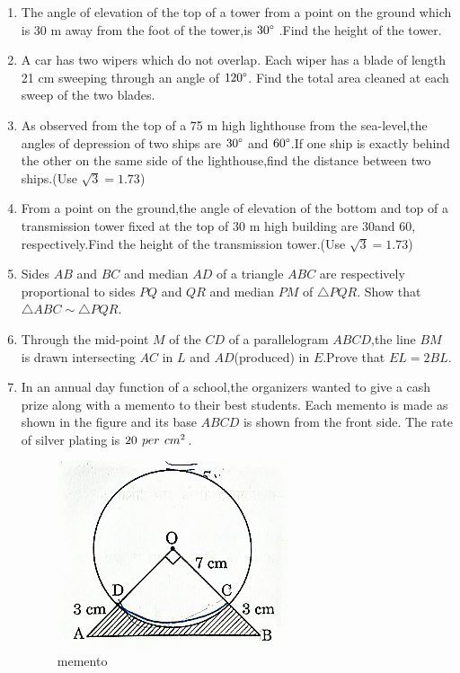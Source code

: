 \documentclass{article}
\begin{document}
\begin{enumerate}
\item  The angle of elevation of the top of a tower from a point on the ground which is 30 m away from the foot of the tower,is $30\degree$ .Find the height of the tower.

\item  A car has two wipers which do not overlap. Each wiper has a blade of length 21 cm sweeping through an angle of $120\degree$. Find the total area cleaned at each sweep of the two blades.

\item  As observed from the top of a 75 m high lighthouse from the sea-level,the angles of depression of two ships are $30\degree$ and $60\degree$.If one ship is exactly behind the other on the same side of the lighthouse,find the distance between two ships.(Use $\sqrt{3} = 1.73$)

\item  From a point on the ground,the angle of elevation of the bottom and top of a transmission tower fixed at the top of 30 m high building are 30\degree and 60\degree, respectively.Find the height of the transmission tower.(Use $\sqrt{3} = 1.73$)
    
\item Sides $AB$ and $BC$ and median $AD$ of a triangle $ABC$ are respectively proportional to sides $PQ$ and $QR$ and median $PM$ of $\triangle PQR$. Show that $\triangle ABC \sim \triangle PQR$. 

\item  Through the mid-point $M$ of the $CD$ of a parallelogram $ABCD$,the line $BM$ is drawn intersecting $AC$ in $L$ and $AD$(produced) in $E$.Prove that $EL=2BL$.

\item  In an annual day function of a school,the organizers wanted to give a cash prize along with a memento to their best students. Each memento is made as shown in  the figure and its base $ABCD$ is shown from the front side. The rate of silver plating is \rupee \hspace{4 pt}$20 \hspace{4 pt} per \hspace{ 4 pt}  cm^2$.

\begin{figure}[h]
    \centering
    \includegraphics[width= 5 cm]{30_2_1_Q36.png}
    \caption{memento}
    \label{fig:img2}
\end{figure}


\end{enumerate}
\end{document}
